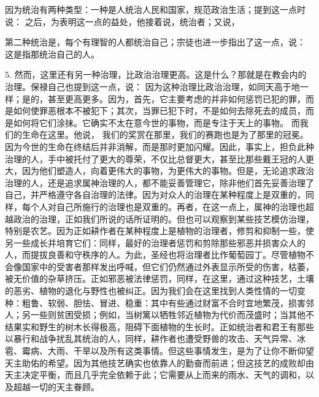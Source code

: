 因为统治有两种类型：一种是人统治人民和国家，规范政治生活；提到这一点时说： 之后，为表明这一点的益处，他接着说，统治者；又说，\par

第二种统治是，每个有理智的人都统治自己；宗徒也进一步指出了这一点，说： 这是指那统治自己的人。\par

5. 然而，这里还有另一种治理，比政治治理更高。这是什么？那就是在教会内的治理。保禄自己也提到这一点，说： 因为这种治理比政治治理，如同天高于地一样；是的，甚至更高更多。因为，首先，它主要考虑的并非如何惩罚已犯的罪，而是如何使罪恶根本不被犯下；其次，当罪已犯下时，不是如何去除死去的成员，而是如何将它们涂抹。它确实不太在意今世的事物，而是专注于天上的事物。 而我们的生命在这里。他说， 我们的奖赏在那里，我们的赛跑也是为了那里的冠冕。因为今世的生命在终结后并非消解，而是那时更加闪耀。因此，事实上，担负此种治理的人，手中被托付了更大的尊荣，不仅比总督更大，甚至比那些戴王冠的人更大，因为他们塑造人，向着更伟大的事物，为更伟大的事物。但是，无论追求政治治理的人，还是追求属神治理的人，都不能妥善管理它，除非他们首先妥善治理了自己，并严格遵守各自治理的法律。因为对众人的治理在某种程度上是双重的，同样，每个人对自己所施行的治理也是双重的。再者，在这一点上，属神的治理也超越政治的治理，正如我们所说的话所证明的。但也可以观察到某些技艺模仿治理，特别是农艺。因为正如耕作者在某种程度上是植物的治理者，修剪和抑制一些，使另一些成长并培育它们：同样，最好的治理者惩罚和剪除那些邪恶并损害众人的人，而提拔良善和守秩序的人。为此，圣经也将治理者比作葡萄园丁。尽管植物不会像国家中的受害者那样发出呼喊，但它们仍然通过外表显示所受的伤害，枯萎，被无价值的杂草挤压。正如邪恶被法律惩罚，同样，在这里，通过这种技艺，土壤的恶劣、植物的退化与野性也被纠正。因为我们会在这里找到人类性情的一切变种：粗鲁、软弱、胆怯、冒进、稳重：其中有些通过财富不合时宜地繁茂，损害邻人；另一些则贫困受损；例如，当树篱以牺牲邻近植物为代价而茂盛时；当其他不结果实和野生的树木长得极高，阻碍下面植物的生长时。正如统治者和君王有那些以暴行和战争扰乱其统治的人，同样，耕作者也遭受野兽的攻击、天气异常、冰雹、霉病、大雨、干旱以及所有这类事情。但这些事情发生，是为了让你不断仰望天主助佑的希望。因为其他技艺确实也依靠人的勤奋而前进；但这技艺的成败却由天主决定平衡，而且几乎完全依赖于此；它需要从上而来的雨水、天气的调和，以及超越一切的天主眷顾。\par

